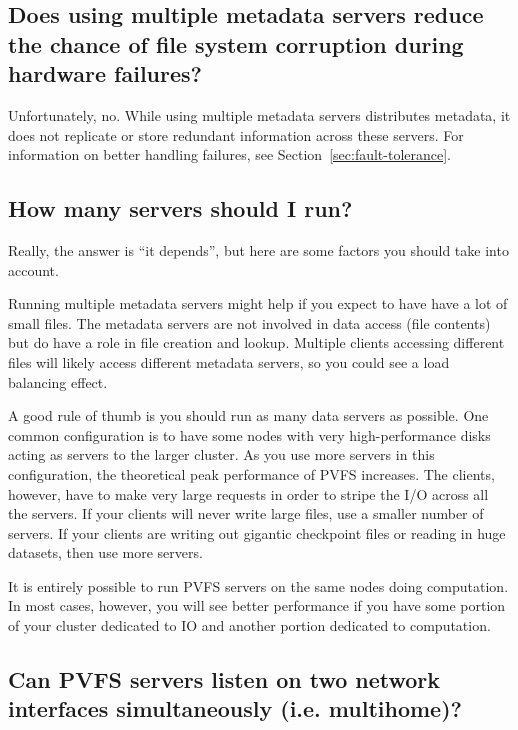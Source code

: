 \documentclass[11pt,letterpaper]{article}
\begin{document}
\subsection{Does using multiple metadata servers reduce the chance of
            file system corruption during hardware failures?}

Unfortunately, no.  While using multiple metadata servers distributes
metadata, it does not replicate or store redundant information across
these servers.  For information on better handling failures, see
Section~\ref{sec:fault-tolerance}.

\subsection{How many servers should I run?}
\label{sec:howmany-servers}

Really, the answer is ``it depends'', but here are some factors you
should take into account.  

Running multiple metadata servers might help if you expect to have have
a lot of small files.  The metadata servers are not involved in data
access (file contents) but do have a role in file creation and lookup.
Multiple clients accessing different files will likely access different
metadata servers, so you could see a load balancing effect.

A good rule of thumb is you should run as many data servers as possible.
One common configuration is to have some nodes with very
high-performance disks acting as servers to the larger cluster.  As you
use more servers in this configuration, the theoretical peak performance
of PVFS increases.  The clients, however, have to make very large
requests in order to stripe the I/O across all the servers.  If your
clients will never write large files, use a smaller number of servers.
If your clients are writing out gigantic checkpoint files or reading in
huge datasets, then use more servers.

It is entirely possible to run PVFS servers on the same nodes doing
computation. In most cases, however, you will see better performance
if you have some portion of your cluster dedicated to IO and another
portion dedicated to computation.


\subsection{Can PVFS servers listen on two network interfaces simultaneously (i.e. multihome)?}
\end{document}
